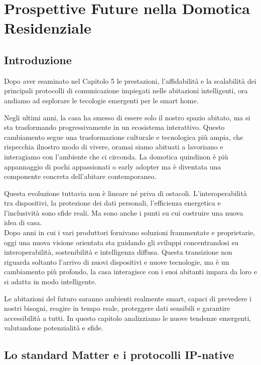 \chapter{Prospettive Future nella Domotica Residenziale}

\section{Introduzione}

Dopo aver esaminato nel Capitolo 5 le prestazioni, l'affidabilità e la scalabilità dei principali protocolli di comunicazione impiegati nelle abitazioni intelligenti, ora andiamo ad esplorare le tecologie emergenti per le smart home.

Negli ultimi anni, la casa ha smesso di essere solo il nostro spazio abitato, ma si sta trasformando progressivamente in un ecosistema interattivo. Questo cambiamento segue una trasformazione culturale e tecnologica più ampia, che rispecchia ilnostro modo di vivere, oramai siamo abituati a lavoriamo e interagiamo con l’ambiente che ci circonda. La domotica quindinon è più appannaggio di pochi appassionati o early adopter ma è diventata una componente concreta dell’abitare contemporaneo.

Questa evoluzione tuttavia non è lineare né priva di ostacoli. L’interoperabilità tra dispositivi, la protezione dei dati personali, l’efficienza energetica e l’inclusività sono sfide reali. Ma sono anche i punti su cui costruire una nuova idea di casa.\\

Dopo anni in cui i vari produttori fornivano soluzioni frammentate e proprietarie, oggi una nuova visione orientata sta guidando gli sviluppi concentrandosi su interoperabilità, sostenibilità e intelligenza diffusa. Questa transizione non riguarda soltanto l’arrivo di nuovi dispositivi e nuove tecnologie, ma è un cambiamento più profondo, la casa interagisce con i suoi abitanti impara da loro e si adatta in modo intelligente.

Le abitazioni del futuro saranno ambienti realmente smart, capaci di prevedere i nostri bisogni, reagire in tempo reale, proteggere dati sensibili e garantire accessibilità a tutti. In questo capitolo analizziamo le nuove tendenze emergenti, valutandone potenzialità e sfide.

\section{Lo standard Matter e i protocolli IP-native}

